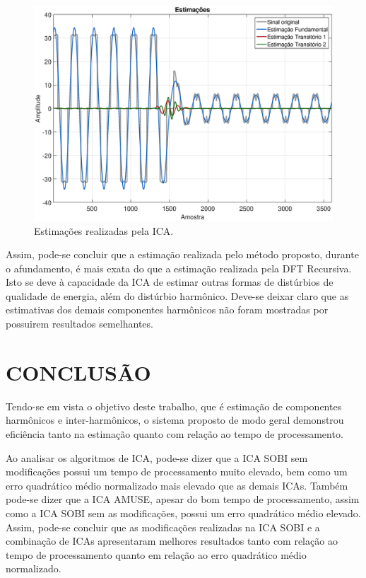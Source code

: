 \documentclass[a4paper,12pt]{monografia}
\theoremstyle{plain}
\theoremstyle{definition}
\theoremstyle{remark}
\begin{document}
\begin{figure}[!htb]
    \begin{center}
    \advance\leftskip -1.5cm
    \includegraphics[scale=0.41]{imagens/Estimacoes.eps}
    \caption{Estimações realizadas pela ICA.}
    \label{fig:sinalafundado3}    
    \end{center}
\end{figure}

Assim, pode-se concluir que a estimação realizada pelo método proposto, durante o afundamento, é mais exata do que a estimação realizada pela DFT Recursiva. Isto se deve à capacidade da ICA de estimar outras formas de distúrbios de qualidade de energia, além do distúrbio harmônico. Deve-se deixar claro que as estimativas dos demais componentes harmônicos não foram mostradas por possuirem resultados semelhantes.

\chapter{CONCLUSÃO}
\label{ch:conclusao}

Tendo-se em vista o objetivo deste trabalho, que é estimação de componentes harmônicos e inter-harmônicos, o sistema proposto de modo geral demonstrou eficiência tanto na estimação quanto com relação ao tempo de processamento.

Ao analisar os algoritmos de ICA, pode-se dizer que a ICA SOBI sem modificações possui um tempo de processamento muito elevado, bem como um erro quadrático médio normalizado mais elevado que as demais ICAs. Também pode-se dizer que a ICA AMUSE, apesar do bom tempo de processamento, assim como a ICA SOBI sem as modificações, possui um erro quadrático médio elevado. Assim, pode-se concluir que as modificações realizadas na ICA SOBI e a combinação de ICAs apresentaram melhores resultados tanto com relação ao tempo de processamento quanto em relação ao erro quadrático médio normalizado.
\end{document}
